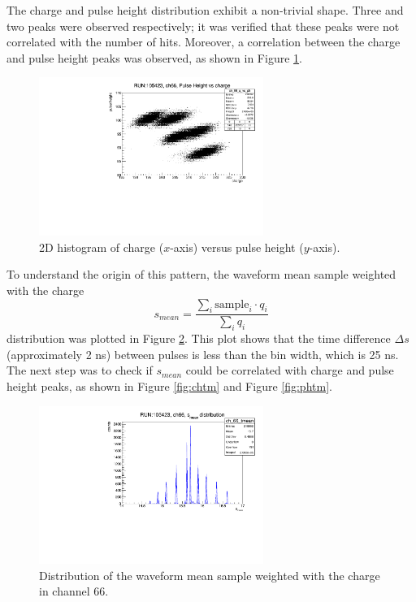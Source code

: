 The charge and pulse height distribution exhibit a non-trivial shape. 
Three and two peaks were observed respectively; it was verified that 
these peaks were not correlated with the number of hits. Moreover, a 
correlation between the charge and pulse height peaks was observed, as shown in Figure \ref{fig:chvsph}. 
\begin{figure}[!h]
  \centering
  \includegraphics[width=0.65\textwidth]{figures/pdf/phch1.pdf}
  \caption{2D histogram of charge ($x$-axis) versus pulse height ($y$-axis).}
  \label{fig:chvsph}
\end{figure}
To understand the origin of this pattern, the waveform mean sample weighted with the charge 
\begin{equation} 
  s_{mean} = \frac{\sum_i \text{sample}_i \cdot q_i }{\sum_i q_i} 
\end{equation}
distribution was plotted in Figure \ref{fig:smean}. 
This plot shows that the time difference $\Delta s$ (approximately 2 ns) between pulses is less than the bin width, which is 25 ns. 
The next step was to check if $s_{mean}$ could be correlated with charge and pulse height peaks, 
as shown in Figure \ref{fig:chtm} and Figure \ref{fig:phtm}.
\begin{figure}[!h]
  \centering
  \includegraphics[width=0.65\textwidth]{figures/pdf/tmean1.pdf}
  \caption{Distribution of the waveform mean sample weighted with the charge in channel 66.}
  \label{fig:smean}
\end{figure}
